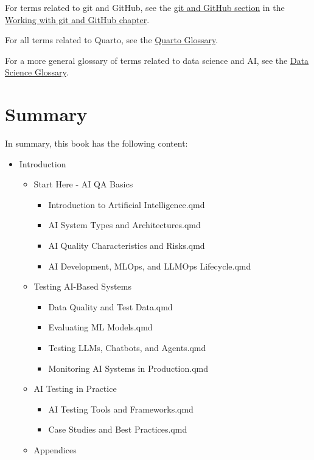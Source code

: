 \documentclass[
  letterpaper,
  DIV=11,
  numbers=noendperiod,
  oneside]{scrreprt}
\providecommand{\tightlist}{%
  \setlength{\itemsep}{0pt}\setlength{\parskip}{0pt}}
\begin{document}
\begin{tcolorbox}
For terms related to git and GitHub, see the \hyperref[resources]{git
and GitHub section} in the
\hyperref[working-with-git-and-github]{Working with git and GitHub
chapter}.

For all terms related to Quarto, see the
\href{https://quarto.org/docs/authoring/glossary/}{Quarto Glossary}.

For a more general glossary of terms related to data science and AI, see
the \href{https://datascienceglossary.org/}{Data Science Glossary}.


\chapter{Summary}\label{summary}

In summary, this book has the following content:

\begin{itemize}
\tightlist
\item
  Introduction

  \begin{itemize}
  \tightlist
  \item
    Start Here - AI QA Basics

    \begin{itemize}
    \tightlist
    \item
      Introduction to Artificial Intelligence.qmd
    \item
      AI System Types and Architectures.qmd
    \item
      AI Quality Characteristics and Risks.qmd
    \item
      AI Development, MLOps, and LLMOps Lifecycle.qmd
    \end{itemize}
  \item
    Testing AI-Based Systems

    \begin{itemize}
    \tightlist
    \item
      Data Quality and Test Data.qmd
    \item
      Evaluating ML Models.qmd
    \item
      Testing LLMs, Chatbots, and Agents.qmd
    \item
      Monitoring AI Systems in Production.qmd
    \end{itemize}
  \item
    AI Testing in Practice

    \begin{itemize}
    \tightlist
    \item
      AI Testing Tools and Frameworks.qmd
    \item
      Case Studies and Best Practices.qmd
    \end{itemize}
  \item
    Appendices


\end{itemize}
\end{itemize}
\end{tcolorbox}
\end{document}

